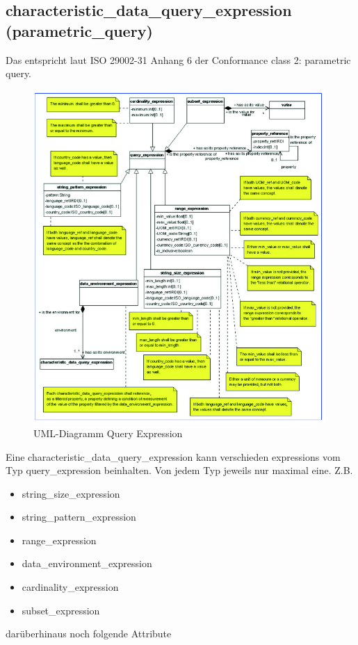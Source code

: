 \subsection{characteristic\_data\_query\_expression (parametric\_query)}\label{sec:characteristicdataqueryexpression}
Das entspricht laut ISO 29002-31 Anhang 6 der Conformance class 2: parametric query.

\begin{figure}[htbp]
	\centering
		\includegraphics[width=0.99\textwidth]{images/query_expression.jpg}
		\caption[UML-Diagramm Query Expression]{UML-Diagramm Query Expression\footnotemark}
	\label{fig:umlqueryexpression}
\end{figure}

Eine characteristic\_data\_query\_expression kann verschieden expressions vom Typ query\_expression beinhalten. Von jedem Typ jeweils nur maximal eine. 
Z.B.
\begin{itemize}
\item string\_size\_expression
\item string\_pattern\_expression
\item range\_expression
\item data\_environment\_expression
\item cardinality\_expression
\item subset\_expression
\end{itemize}
darüberhinaus noch folgende Attribute

